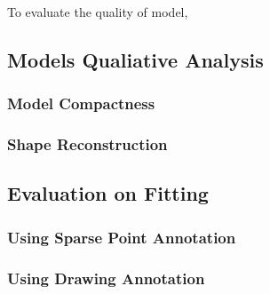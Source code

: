 To evaluate the quality of model, 
\subsection{Models Qualiative Analysis}

\subsubsection{Model Compactness}

\subsubsection{Shape Reconstruction}



\subsection{Evaluation on Fitting}

\subsubsection{Using Sparse Point Annotation}

\subsubsection{Using Drawing Annotation}

\clearpage